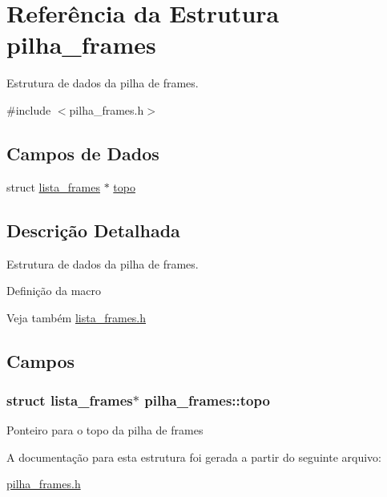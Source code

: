 \hypertarget{structpilha__frames}{}\section{Referência da Estrutura pilha\+\_\+frames}
\label{structpilha__frames}


Estrutura de dados da pilha de frames.  




{\ttfamily \#include $<$pilha\+\_\+frames.\+h$>$}

\subsection*{Campos de Dados}
\begin{DoxyCompactItemize}
\item 
struct \hyperlink{structlista__frames}{lista\+\_\+frames} $\ast$ \hyperlink{structpilha__frames_a0f1e93df36de953f6ee6789cea5fd34f}{topo}
\end{DoxyCompactItemize}


\subsection{Descrição Detalhada}
Estrutura de dados da pilha de frames. 

Definição da macro

\begin{DoxySeeAlso}{Veja também}
\hyperlink{lista__frames_8h}{lista\+\_\+frames.\+h} 
\end{DoxySeeAlso}


\subsection{Campos}
\subsubsection[{\texorpdfstring{topo}{topo}}]{\setlength{\rightskip}{0pt plus 5cm}struct {\bf lista\+\_\+frames}$\ast$ pilha\+\_\+frames\+::topo}\hypertarget{structpilha__frames_a0f1e93df36de953f6ee6789cea5fd34f}{}\label{structpilha__frames_a0f1e93df36de953f6ee6789cea5fd34f}
Ponteiro para o topo da pilha de frames 

A documentação para esta estrutura foi gerada a partir do seguinte arquivo\+:\begin{DoxyCompactItemize}
\item 
\hyperlink{pilha__frames_8h}{pilha\+\_\+frames.\+h}\end{DoxyCompactItemize}
